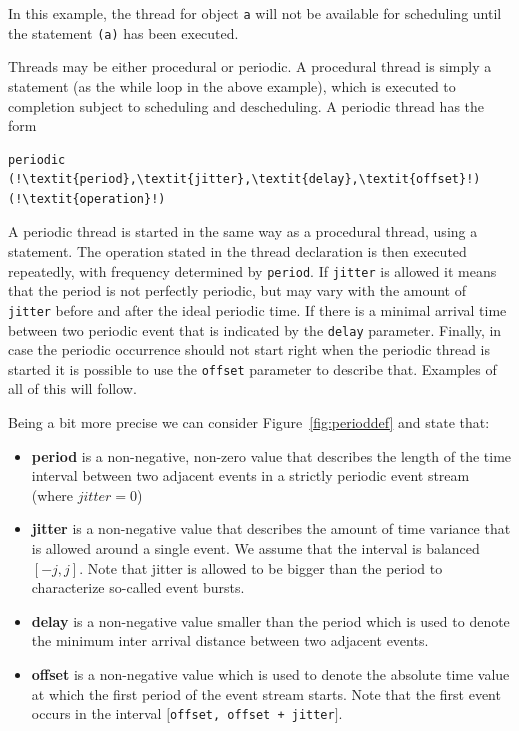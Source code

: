 \documentclass{overturerepchap}
\begin{document}
In this example, the thread for object \texttt{a} will not be available for
scheduling until the statement {\bf{}}\texttt{(a)} 
has been executed.

Threads may be either procedural or periodic. A procedural thread is
simply a statement (as the while loop in the above example), which is
executed to completion subject to scheduling and descheduling. A
periodic thread has the form

\begin{lstlisting}
periodic (!\textit{period},\textit{jitter},\textit{delay},\textit{offset}!) (!\textit{operation}!)
\end{lstlisting}

A periodic thread is started in the same way as a procedural thread,
using a {\bf{}} statement. The operation stated in the thread
declaration is then executed repeatedly, with frequency determined by
\texttt{period}. If \texttt{jitter} is allowed it means that the period 
is not perfectly periodic, but may vary with the amount of
\texttt{jitter} before and after the ideal periodic time. If there is
a minimal arrival time between two periodic event that is indicated by
the \texttt{delay} parameter. Finally, in case the periodic occurrence
should not start right when the periodic thread is started it is
possible to use the \texttt{offset} parameter to describe
that. Examples of all of this will follow.

Being a bit more precise we can consider Figure~\ref{fig:perioddef} and
state that:
\begin{itemize}
\item \textbf{period} is a non-negative, non-zero value
that describes the length of the time interval between
two adjacent events in a strictly periodic event stream
(where $jitter=0$)
\item \textbf{jitter} is a non-negative value that describes
the amount of time variance that is allowed around a single
event. We assume that the interval is balanced $[-j,j]$.
Note that jitter is allowed to be bigger than the period
to characterize so-called event bursts.
\item \textbf{delay} is a non-negative value smaller than
the period which is used to denote the minimum inter arrival
distance between two adjacent events.
\item \textbf{offset} is a non-negative value which is used
to denote the absolute time value at which the first period
of the event stream starts. Note that the first event
occurs in the interval $[$\texttt{offset, offset + jitter}$]$.
\end{itemize}
\end{document}
